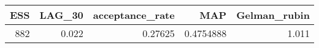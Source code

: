 \begin{longtable}{rrrrr}
\toprule
ESS & LAG\_30 & acceptance\_rate & MAP & Gelman\_rubin \\ 
\midrule
882 & 0.022 & 0.27625 & 0.4754888 & 1.011 \\ 
\bottomrule
\end{longtable}

